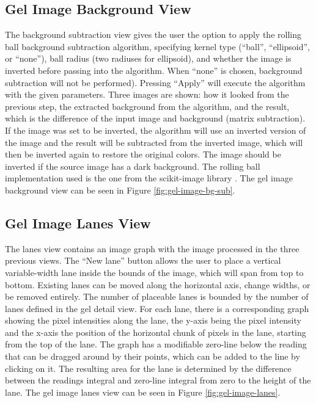 \subsection{Gel Image Background View}

The background subtraction view gives the user the option to apply the rolling ball background subtraction algorithm, specifying kernel type (“ball”, “ellipsoid”, or “none”), ball radius (two radiuses for ellipsoid), and whether the image is inverted before passing into the algorithm. When “none” is chosen, background subtraction will not be performed). Pressing “Apply” will execute the algorithm with the given parameters. Three images are shown: how it looked from the previous step, the extracted background from the algorithm, and the result, which is the difference of the input image and background (matrix subtraction). If the image was set to be inverted, the algorithm will use an inverted version of the image and the result will be subtracted from the inverted image, which will then be inverted again to restore the original colors. The image should be inverted if the source image has a dark background. The rolling ball implementation used is the one from the scikit-image library \cite{rolling-ball}. The gel image background view can be seen in Figure \ref{fig:gel-image-bg-sub}.

\subsection{Gel Image Lanes View}
The lanes view contains an image graph with the image processed in the three previous views. The “New lane” button allows the user to place a vertical variable-width lane inside the bounds of the image, which will span from top to bottom. Existing lanes can be moved along the horizontal axis, change widths, or be removed entirely. The number of placeable lanes is bounded by the number of lanes defined in the gel detail view. 
For each lane, there is a corresponding graph showing the pixel intensities along the lane, the y-axis being the pixel intensity and the x-axis the position of the horizontal chunk of pixels in the lane, starting from the top of the lane. The graph has a modifiable zero-line below the reading that can be dragged around by their points, which can be added to the line by clicking on it. The resulting area for the lane is determined by the difference between the readings integral and zero-line integral from zero to the height of the lane. The gel image lanes view can be seen in Figure \ref{fig:gel-image-lanes}.

